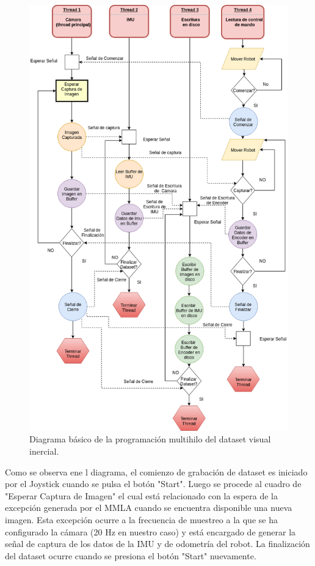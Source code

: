 \begin{figure}[H]
	\centering
	\includegraphics[width=1.0\linewidth]{imagenes/Implementacion/DiagramaMultithread}
	\caption{Diagrama básico de la programación multihilo del dataset visual inercial.}
	\label{imagen:diagramaMultithread}
\end{figure}

Como se observa ene l diagrama, el comienzo de grabación de dataset es iniciado por el Joystick cuando se pulsa el botón "Start". Luego se procede al cuadro de "Esperar Captura de Imagen" el cual está relacionado con la espera de la excepción generada por el MMLA cuando se encuentra disponible una nueva imagen. Esta excepción ocurre a la frecuencia de muestreo a la que se ha configurado la cámara (20 Hz en nuestro caso) y está encargado de generar la señal de captura de los datos de la IMU y de odometría del robot. La finalización del dataset ocurre cuando se presiona el botón "Start" nuevamente.

